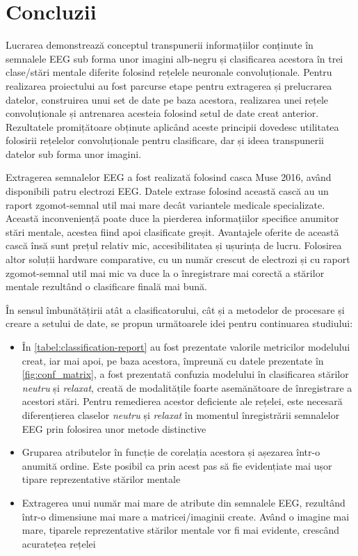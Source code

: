 \chapter{Concluzii}\label{ch:4concluzii}
Lucrarea demonstrează conceptul transpunerii informațiilor conținute în semnalele EEG sub forma unor imagini alb-negru și clasificarea acestora în trei clase/stări mentale diferite folosind rețelele neuronale convoluționale. Pentru realizarea proiectului au fost parcurse etape pentru extragerea și prelucrarea datelor, construirea unui set de date pe baza acestora, realizarea unei rețele convoluționale și antrenarea acesteia folosind setul de date creat anterior. Rezultatele promițătoare obținute aplicând aceste principii dovedesc utilitatea folosirii rețelelor convoluționale pentru clasificare, dar și ideea transpunerii datelor sub forma unor imagini.

Extragerea semnalelor EEG a fost realizată folosind casca Muse 2016, având disponibili patru electrozi EEG. Datele extrase folosind această cască au un raport zgomot-semnal util mai mare decât variantele medicale specializate. Această inconveniență poate duce la pierderea informațiilor specifice anumitor stări mentale, acestea fiind apoi clasificate greșit. Avantajele oferite de această cască însă sunt  prețul relativ mic, accesibilitatea și ușurința de lucru. Folosirea altor soluții hardware comparative, cu un număr crescut de electrozi și cu raport zgomot-semnal util mai mic va duce la o înregistrare mai corectă a stărilor mentale rezultând o clasificare finală mai bună.

În sensul îmbunătățirii atât a clasificatorului, cât și a metodelor de procesare și creare a setului de date, se propun următoarele idei pentru continuarea studiului:
\begin{itemize}
\item În \autoref{tabel:classification-report} au fost prezentate valorile metricilor modelului creat, iar mai apoi, pe baza acestora, împreună cu datele prezentate în \autoref{fig:conf_matrix}, a fost prezentată confuzia modelului în clasificarea stărilor \textit{neutru} și \textit{relaxat}, creată de modalitățile foarte asemănătoare de înregistrare a acestori stări. Pentru remedierea acestor deficiente ale rețelei, este necesară diferențierea claselor \textit{neutru} și \textit{relaxat} în momentul înregistrării semnalelor EEG prin folosirea unor metode distinctive
\item Gruparea atributelor în funcție de corelația acestora și așezarea într-o anumită ordine. Este posibil ca prin acest pas să fie evidențiate mai ușor tipare reprezentative stărilor mentale
\item Extragerea unui număr mai mare de atribute din semnalele EEG, rezultând într-o dimensiune mai mare a matricei/imaginii create. Având o imagine mai mare, tiparele reprezentative stărilor mentale vor fi mai evidente, crescând acuratețea rețelei
\end{itemize}